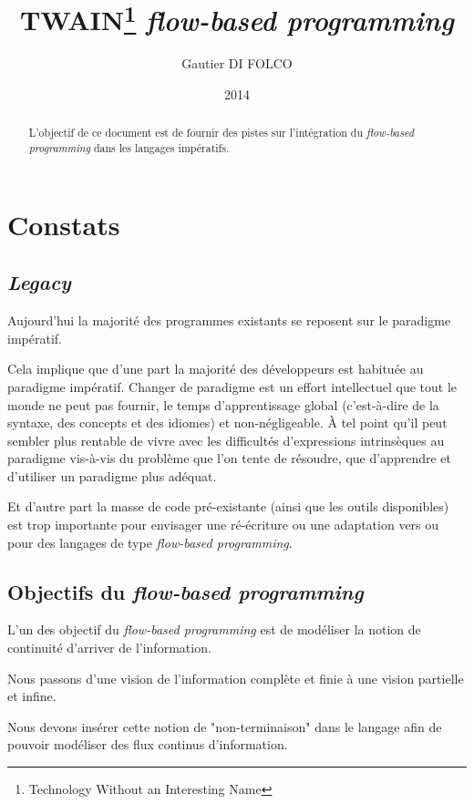 \documentclass{article}
\title{TWAIN\footnote{Technology Without an Interesting Name} \emph{flow-based programming}}
\author{Gautier DI FOLCO}
\date{2014}
\begin{document}
\maketitle
\tableofcontents

\begin{abstract}
L'objectif de ce document est de fournir des pistes sur l'intégration du
\emph{flow-based programming} dans les langages impératifs.
\end{abstract}

\section{Constats}
\subsection{\emph{Legacy}}
Aujourd'hui la majorité des programmes existants se reposent sur le paradigme impératif.

Cela implique que d'une part la majorité des développeurs est habituée au paradigme
impératif.
Changer de paradigme est un effort intellectuel que tout le monde ne peut pas fournir,
le temps d'apprentissage global (c'est-à-dire de la syntaxe, des concepts et des
idiomes) et non-négligeable.
À tel point qu'il peut sembler plus rentable de vivre avec les difficultés
d'expressions intrinsèques au paradigme vis-à-vis du problème que l'on tente de
résoudre, que d'apprendre et d'utiliser un paradigme plus adéquat.

Et d'autre part la masse de code pré-existante (ainsi que les outils disponibles)
est trop importante pour envisager une ré-écriture ou une adaptation
vers ou pour des langages de type \emph{flow-based programming}.

\subsection{Objectifs du \emph{flow-based programming}}
L'un des objectif du \emph{flow-based programming} est de modéliser la notion de
continuité d'arriver de l'information.

Nous passons d'une vision de l'information complète et finie à une vision partielle
et infine.

Nous devons insérer cette notion de "non-terminaison" dans le langage afin de
pouvoir modéliser des flux continus d'information.
\end{document}
